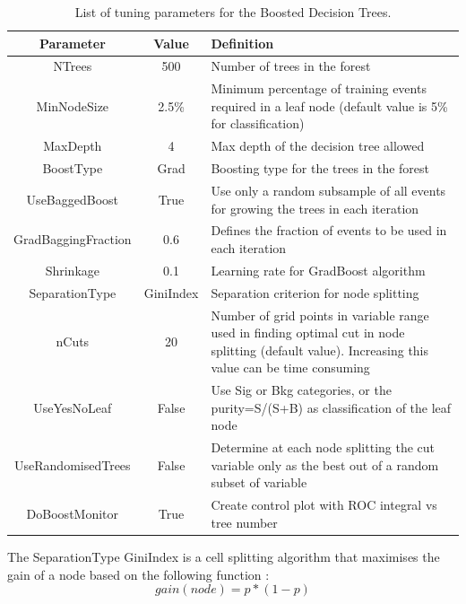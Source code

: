 \documentclass{cernatlasnote}
\begin{document}
\begin{appendices}
\FloatBarrier

\begin{table}[h]
\begin{center}
\begin{tabular}{ |c|c|m{8cm}| } 
    \hline
    \rowcolor{lightgray} 
    Parameter & Value & Definition\\
    \hline
    NTrees & 500 & Number of trees in the forest  \\ 
    \hline
    MinNodeSize & 2.5\% & Minimum percentage of training
events required in a leaf node (default value is 5\% for classification) \\
    \hline
    MaxDepth & 4 & Max depth of the decision tree allowed \\ 
    \hline
    BoostType & Grad & Boosting type for the trees in the forest  \\ 
    \hline
    UseBaggedBoost & True & Use only a random subsample of all
    events for growing the trees in each iteration \\
    \hline
    GradBaggingFraction & 0.6 & Defines the fraction of
events to be used in each iteration \\
    \hline
    Shrinkage & 0.1 & Learning rate for GradBoost algorithm \\
    \hline
    SeparationType & GiniIndex & Separation criterion for node splitting \\
    \hline
    nCuts & 20 & Number of grid points in variable
range used in finding optimal cut in
node splitting (default value). Increasing this value can be time consuming\\
    \hline
    UseYesNoLeaf & False & Use Sig or Bkg categories, or the purity=S/(S+B) as classification of the
leaf node \\
    \hline
    UseRandomisedTrees & False & Determine at each node splitting the
cut variable only as the best out of
a random subset of variable \\
    \hline
    DoBoostMonitor & True & Create control plot with ROC integral
vs tree number \\
    \hline
\end{tabular}
\end{center}
\caption{List of tuning parameters for the Boosted Decision Trees.}
\label{TAB : BDTPARA}
\end{table}
The SeparationType GiniIndex is a cell splitting algorithm that maximises the gain of a node based on the following function :
\begin{equation}
    gain(node) = p*(1-p)

\end{equation}
\end{appendices}
\end{document}
